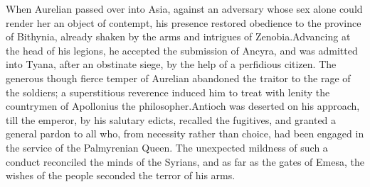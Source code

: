 
When Aurelian passed over into Asia, against an adversary whose
sex alone could render her an object of contempt, his presence
restored obedience to the province of Bithynia, already shaken by
the arms and intrigues of Zenobia.\footnotemark[62] Advancing at the head of
his legions, he accepted the submission of Ancyra, and was
admitted into Tyana, after an obstinate siege, by the help of a
perfidious citizen. The generous though fierce temper of Aurelian
abandoned the traitor to the rage of the soldiers; a
superstitious reverence induced him to treat with lenity the
countrymen of Apollonius the philosopher.\footnotemark[63] Antioch was deserted
on his approach, till the emperor, by his salutary edicts,
recalled the fugitives, and granted a general pardon to all who,
from necessity rather than choice, had been engaged in the
service of the Palmyrenian Queen. The unexpected mildness of such
a conduct reconciled the minds of the Syrians, and as far as the
gates of Emesa, the wishes of the people seconded the terror of
his arms.\footnotemark[64]




